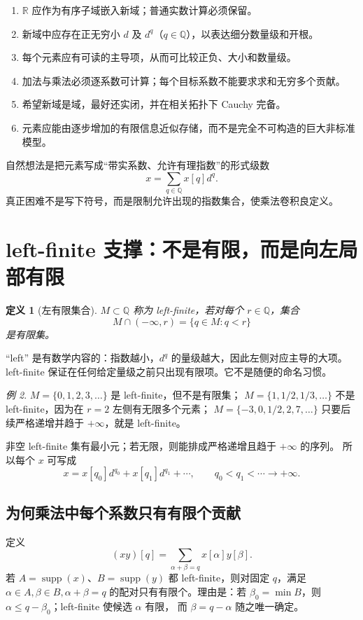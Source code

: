\documentclass[11pt,a4paper]{article}
\newtheorem{definition}{定义}[section]
\theoremstyle{remark}
\newtheorem{example}[definition]{例}
\newcommand{\supp}{\operatorname{supp}}
\newcommand{\R}{\mathbb R}
\newcommand{\Q}{\mathbb Q}
\begin{document}
\begin{enumerate}
\item $\R$ 应作为有序子域嵌入新域；普通实数计算必须保留。
\item 新域中应存在正无穷小 $d$ 及 $d^q$（$q\in\Q$），以表达细分数量级和开根。
\item 每个元素应有可读的主导项，从而可比较正负、大小和数量级。
\item 加法与乘法必须逐系数可计算；每个目标系数不能要求求和无穷多个贡献。
\item 希望新域是域，最好还实闭，并在相关拓扑下 Cauchy 完备。
\item 元素应能由逐步增加的有限信息近似存储，而不是完全不可构造的巨大非标准模型。
\end{enumerate}

自然想法是把元素写成“带实系数、允许有理指数”的形式级数
\[
x=\sum_{q\in\Q}x[q]d^q.
\]
真正困难不是写下符号，而是限制允许出现的指数集合，使乘法卷积良定义。

\section{left-finite 支撑：不是有限，而是向左局部有限}

\begin{definition}[左有限集合]
$M\subset\Q$ 称为 left-finite，若对每个 $r\in\Q$，集合
\[
M\cap(-\infty,r)=\{q\in M:q<r\}
\]
是有限集。
\end{definition}

“left” 是有数学内容的：指数越小，$d^q$ 的量级越大，因此左侧对应主导的大项。
left-finite 保证在任何给定量级之前只出现有限项。它不是随便的命名习惯。

\begin{example}
$M=\{0,1,2,3,\dots\}$ 是 left-finite，但不是有限集；
$M=\{1,1/2,1/3,\dots\}$ 不是 left-finite，因为在 $r=2$ 左侧有无限多个元素；
$M=\{-3,0,1/2,2,7,\dots\}$ 只要后续严格递增并趋于 $+\infty$，就是 left-finite。
\end{example}

非空 left-finite 集有最小元；若无限，则能排成严格递增且趋于 $+\infty$ 的序列。
所以每个 $x$ 可写成
\[
x=x[q_0]d^{q_0}+x[q_1]d^{q_1}+\cdots,
\qquad q_0<q_1<\cdots\to+\infty.
\]

\subsection{为何乘法中每个系数只有有限个贡献}

定义
\[
(xy)[q]=\sum_{\alpha+\beta=q}x[\alpha]y[\beta].
\]
若 $A=\supp(x)$、$B=\supp(y)$ 都 left-finite，则对固定 $q$，满足
$\alpha\in A,\beta\in B,\alpha+\beta=q$ 的配对只有有限个。理由是：若
$\beta_0=\min B$，则 $\alpha\le q-\beta_0$；left-finite 使候选 $\alpha$ 有限，
而 $\beta=q-\alpha$ 随之唯一确定。
\end{document}
